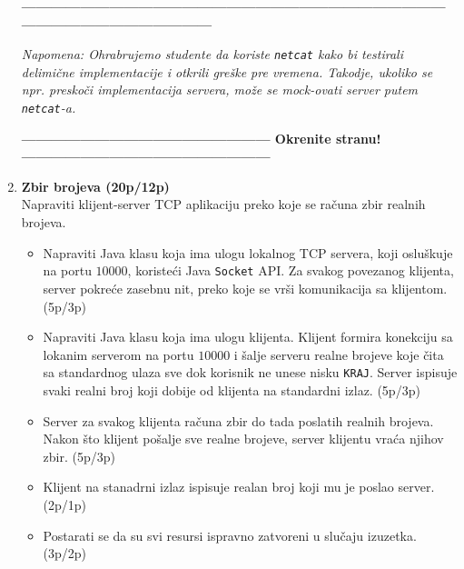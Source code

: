 \documentclass[]{article}
\begin{document}
\begin{enumerate}
\begin{center}
  \textbf{------------------------------------------------------------------------------------------------------------------------------}
\end{center}
\textit{Napomena: Ohrabrujemo studente da koriste \texttt{netcat} kako bi testirali delimi\v{c}ne implementacije i otkrili gre\v{s}ke pre vremena. Takodje, ukoliko se npr. presko\v{c}i implementacija servera, mo\v{z}e se mock-ovati server putem \texttt{netcat}-a.} 
\begin{center}
  \textbf{--------------------------------------------------- Okrenite stranu! ---------------------------------------------------}
\end{center}

\newpage

\item \textbf{Zbir brojeva (20p/12p)}
\\Napraviti klijent-server TCP aplikaciju preko koje se ra\v{c}una zbir realnih brojeva.
\begin{itemize}
  \item Napraviti Java klasu koja ima ulogu lokalnog TCP servera, koji oslu\v{s}kuje na portu $10000$, koriste\'c{}i Java \texttt{Socket} API. Za svakog povezanog klijenta, server pokre\'ce zasebnu nit, preko koje se vr\v{s}i komunikacija sa klijentom. \hfill (5p/3p)
  \item Napraviti Java klasu koja ima ulogu klijenta. Klijent formira konekciju sa lokanim serverom na portu $10000$ i \v{s}alje serveru realne brojeve koje \v{c}ita sa standardnog ulaza sve dok korisnik ne unese nisku \texttt{KRAJ}. Server ispisuje svaki realni broj koji dobije od klijenta na standardni izlaz. \hfill (5p/3p)
  \item Server za svakog klijenta ra\v{c}una zbir do tada poslatih realnih brojeva. Nakon \v{s}to klijent po\v{s}alje sve realne brojeve, server klijentu vra\'ca njihov zbir. \hfill (5p/3p)
  \item Klijent na stanadrni izlaz ispisuje realan broj koji mu je poslao server.\hfill (2p/1p)
  \item Postarati se da su svi resursi ispravno zatvoreni u slu\v{c}aju izuzetka. \hfill (3p/2p)
\end{itemize}

\vspace{15pt}


\end{enumerate}
\end{document}
